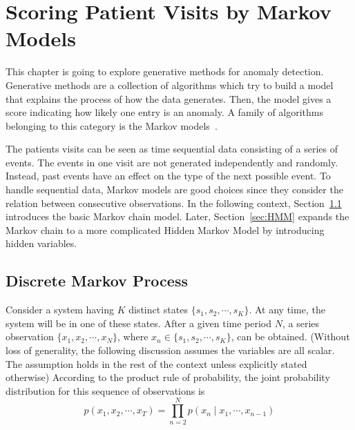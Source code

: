 \chapter{Scoring Patient Visits by Markov Models}
\label{chapter:generative}
This chapter is going to explore generative methods for anomaly detection. Generative methods are a collection of algorithms which try to build a model that explains the process of how the data generates. Then, the model gives a score indicating how likely one entry is an anomaly. A family of algorithms belonging to this category is the Markov models~\cite{isaacson1976markov}.

The patients visits can be seen as time sequential data consisting of a series of events. The events in one visit are not generated independently and randomly. Instead, past events have an effect on the type of the next possible event. To handle sequential data, Markov models are good choices since they consider the relation between consecutive observations. In the following context, Section~\ref{sec:MM} introduces the basic Markov chain model. Later, Section~\ref{sec:HMM} expands the Markov chain to a more complicated Hidden Markov Model by introducing hidden variables.

\section{Discrete Markov Process}
\label{sec:MM}
Consider a system having \(K\) distinct states \(\{s_1, s_2, \cdots, s_K\}\). At any time, the system will be in one of these states. After a given time period \(N\), a series observation \(\{x_1, x_2, \cdots, x_N\}\), where $x_n \in \{s_1, s_2, \cdots, s_K\}$, can be obtained. (Without loss of generality, the following discussion assumes the variables are all scalar. The assumption holds in the rest of the context unless explicitly stated otherwise) According to the product rule of probability, the joint probability distribution for this sequence of observations is
\begin{equation}
	p(x_1, x_2, \cdots, x_T) = \prod_{n = 2}^{N} p(x_n \mid x_1, \cdots, x_{n-1})
\end{equation}

